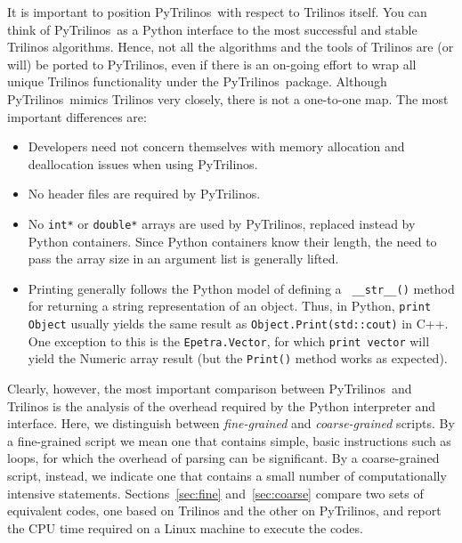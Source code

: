 \documentclass[acmtocl]{acmtrans2m}
\newcommand{\PyTrilinos}{{PyTrilinos}}
\begin{document}
It is important to position \PyTrilinos\ with respect to Trilinos
itself.  You can think of \PyTrilinos\ as a Python interface to the
most successful and stable Trilinos algorithms.  Hence, not all the
algorithms and the tools of Trilinos are (or will) be ported to
\PyTrilinos, even if there is an on-going effort to wrap all unique
Trilinos functionality under the \PyTrilinos\ package.  Although
\PyTrilinos\ mimics Trilinos very closely, there is not a one-to-one
map.  The most important differences are:

\begin{itemize}

\item Developers need not concern themselves with memory allocation
  and deallocation issues when using \PyTrilinos.

\item No header files are required by \PyTrilinos.

\item No {\tt int*} or {\tt double*} arrays are used by \PyTrilinos,
  replaced instead by Python containers.  Since Python containers know
  their length, the need to pass the array size in an argument list is
  generally lifted.

\item Printing generally follows the Python model of defining a {\tt
  \_\_str\_\_()} method for returning a string representation of an
  object.  Thus, in Python, {\tt print Object} usually yields the same
  result as {\tt Object.Print(std::cout)} in C++.  One exception to
  this is the {\tt Epetra.Vector}, for which {\tt print vector} will
  yield the Numeric array result (but the {\tt Print()} method works
  as expected).

\end{itemize}

Clearly, however, the most important comparison between
\PyTrilinos\ and Trilinos is the analysis of the overhead required by
the Python interpreter and interface.  Here, we distinguish between
{\sl fine-grained} and {\sl coarse-grained} scripts.  By a
fine-grained script we mean one that contains simple, basic
instructions such as loops, for which the overhead of parsing can be
significant.  By a coarse-grained script, instead, we indicate one
that contains a small number of computationally intensive statements.
Sections~\ref{sec:fine} and~\ref{sec:coarse} compare two sets of
equivalent codes, one based on Trilinos and the other on \PyTrilinos,
and report the CPU time required on a Linux machine to execute the
codes.
\end{document}
